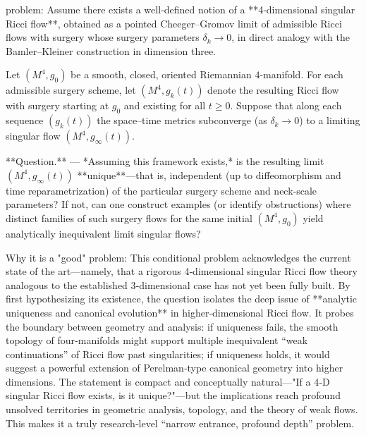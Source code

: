 problem:  
Assume there exists a well‑defined notion of a **4‑dimensional singular Ricci flow**, obtained as a pointed Cheeger–Gromov limit of admissible Ricci flows with surgery whose surgery parameters \( \delta_k \to 0 \), in direct analogy with the Bamler–Kleiner construction in dimension three.  

Let \( (M^4, g_0) \) be a smooth, closed, oriented Riemannian \(4\)-manifold.  For each admissible surgery scheme, let \( (M^4, g_k(t)) \) denote the resulting Ricci flow with surgery starting at \(g_0\) and existing for all \(t \ge 0\).  
Suppose that along each sequence \( (g_k(t)) \) the space–time metrics subconverge (as \( \delta_k \to 0 \)) to a limiting singular flow \( (M^4, g_\infty(t)) \).  

**Question.** — *Assuming this framework exists,* is the resulting limit \( (M^4, g_\infty(t)) \) **unique**—that is, independent (up to diffeomorphism and time reparametrization) of the particular surgery scheme and neck‑scale parameters?  
If not, can one construct examples (or identify obstructions) where distinct families of such surgery flows for the same initial \( (M^4, g_0) \) yield analytically inequivalent limit singular flows?  

Why it is a "good" problem:  
This conditional problem acknowledges the current state of the art—namely, that a rigorous 4‑dimensional singular Ricci flow theory analogous to the established 3‑dimensional case has not yet been fully built. By first hypothesizing its existence, the question isolates the deep issue of **analytic uniqueness and canonical evolution** in higher‑dimensional Ricci flow.  
It probes the boundary between geometry and analysis: if uniqueness fails, the smooth topology of four‑manifolds might support multiple inequivalent “weak continuations” of Ricci flow past singularities; if uniqueness holds, it would suggest a powerful extension of Perelman‑type canonical geometry into higher dimensions.  
The statement is compact and conceptually natural—"If a 4‑D singular Ricci flow exists, is it unique?"—but the implications reach profound unsolved territories in geometric analysis, topology, and the theory of weak flows. This makes it a truly research‑level “narrow entrance, profound depth” problem.